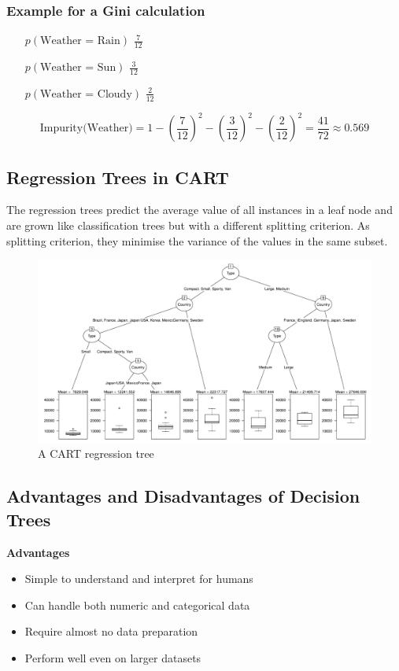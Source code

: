 \documentclass[11pt]{article}
\begin{document}
\subsubsection{Example for a Gini calculation}
\begin{itemize}[leftmargin=*, labelindent=4cm, labelsep=1cm]
    \item[$p(\text{Weather = Rain})$] $\frac{7}{12}$
    \item[$p(\text{Weather = Sun})$] $\frac{3}{12}$
    \item[$p(\text{Weather = Cloudy})$] $\frac{2}{12}$
\end{itemize}

\begin{equation*}
    \text{Impurity(Weather)} = 1 - (\frac{7}{12})^2 - (\frac{3}{12})^2 - (\frac{2}{12})^2 = \frac{41}{72} \approx 0.569
\end{equation*}

\subsection{Regression Trees in CART}

The regression trees predict the average value of all instances in a leaf node and are grown like classification trees but with a different splitting criterion. As splitting criterion, they minimise the variance of the values in the same subset.

\begin{figure}[tbh!]
    \centering
    \includegraphics[width=0.7\linewidth, keepaspectratio]{Pictures/regression_tree_CART}
    \caption{A CART regression tree}
    \label{fig:regressiontreecart}
\end{figure}

\subsection{Advantages and Disadvantages of Decision Trees}

\textbf{Advantages}
\begin{itemize}
    \item Simple to understand and interpret for humans
    \item Can handle both numeric and categorical data
    \item Require almost no data preparation
    \item Perform well even on larger datasets
\end{itemize}
\end{document}
